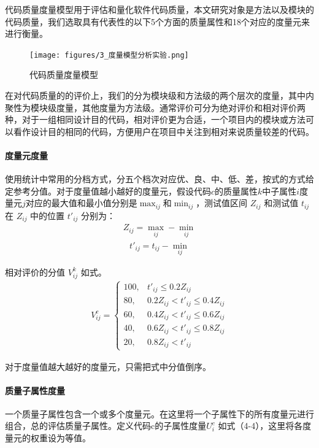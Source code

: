 代码质量度量模型用于评估和量化软件代码质量，本文研究对象是方法以及模块的代码质量，我们选取具有代表性的以下5个方面的质量属性和18个对应的度量元来进行衡量。

\begin{figure}[h]
\centering
\texttt{[image: figures/3\_度量模型分析实验.png]}
\caption{代码质量度量模型}
\end{figure}

在对代码质量的的评价上，我们的分为模块级和方法级的两个层次的度量，其中内聚性为模块级度量，其他度量为方法级。通常评价可分为绝对评价和相对评价两种，对于一组相同设计目的代码，相对评价更为合适\cite{黄沛杰2011代码质量静态度量的研究与应用}，一个项目内的模块或方法可以看作设计目的相同的代码，方便用户在项目中关注到相对来说质量较差的代码。

\paragraph{度量元度量} 使用统计中常用的分档方式，分五个档次对应优、良、中、低、差，按式的方式给定参考分值。对于度量值越小越好的度量元，假设代码$c$的质量属性$k$中子属性$i$度量元$j$对应的最大值和最小值分别是$\max_{ij}$和$\min_{ij}$，测试值区间 \(Z_{ij}\) 和测试值 \(t_{ij}\) 在 \(Z_{ij}\) 中的位置 \(t'_{ij}\) 分别为：
\begin{align}
Z_{ij} = \max_{ij} - \min_{ij}
\end{align}
\begin{align}
t'_{ij} = t_{ij} - \min_{ij}
\end{align}

相对评价的分值 \(V_{ij}^k\) 如式。
\begin{align}
V_{ij}^c = 
\begin{cases} 
100, & t'_{ij} \leq 0.2Z_{ij} \\ 
80, & 0.2Z_{ij} < t'_{ij} \leq 0.4Z_{ij} \\ 
60, & 0.4Z_{ij} < t'_{ij} \leq 0.6Z_{ij} \\ 
40, & 0.6Z_{ij} < t'_{ij} \leq 0.8Z_{ij} \\ 
20, & 0.8Z_{ij} < t'_{ij}
\end{cases}
\end{align}

对于度量值越大越好的度量元，只需把式中分值倒序。

\paragraph{质量子属性度量} 一个质量子属性包含一个或多个度量元。在这里将一个子属性下的所有度量元进行组合，总的评估质量子属性。定义代码c的子属性度量$U_{i}^c$ 如式（4-4），这里将各度量元的权重设为等值。

